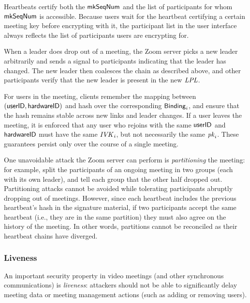 Heartbeats certify both the $\mathsf{mkSeqNum}$ and the list of participants for whom
$\mathsf{mkSeqNum}$ is accessible. Because users wait for the heartbeat certifying a certain meeting
key before encrypting with it, the participant list in the user interface always reflects the list
of participants users are encrypting for.

When a leader does drop out of a meeting, the Zoom server picks a new leader arbitrarily and sends a
signal to participants indicating that the leader has changed. The new leader then coalesces the
chain as described above, and other participants verify that the new leader is present in the new
$\mathit{LPL}$.

For users in the meeting, clients remember the mapping between $(\mathsf{userID}, {\sf hardwareID})$ and hash
over the corresponding ${\sf Binding}_i$, and ensure that the hash remains stable across new links and
leader changes. If a user leaves the meeting, it is enforced that any user who rejoins with the same
$\mathsf{userID}$ and ${\sf hardwareID}$ must have the same $\mathit{IVK}_i$, but not necessarily the same $\mathit{pk}_i$. These
guarantees persist only over the course of a single meeting.

One unavoidable attack the Zoom server can perform is \textit{partitioning} the meeting: for
example, split the participants of an ongoing meeting in two groups (each with its own leader), and
tell each group that the other half dropped out. Partitioning attacks cannot be avoided while
tolerating participants abruptly dropping out of meetings. However, since each heartbeat includes
the previous heartbeat's hash in the signature material, if two participants accept the same
heartbeat (i.e., they are in the same partition) they must also agree on the history of the meeting.
In other words, partitions cannot be reconciled as their heartbeat chains have diverged.

\subsubsection{Liveness}\label{subsubsec:liveness} 
An important security property in video meetings (and other synchronous communications) is
\textit{liveness}: attackers should not be able to significantly delay meeting data or meeting
management actions (such as adding or removing users).

